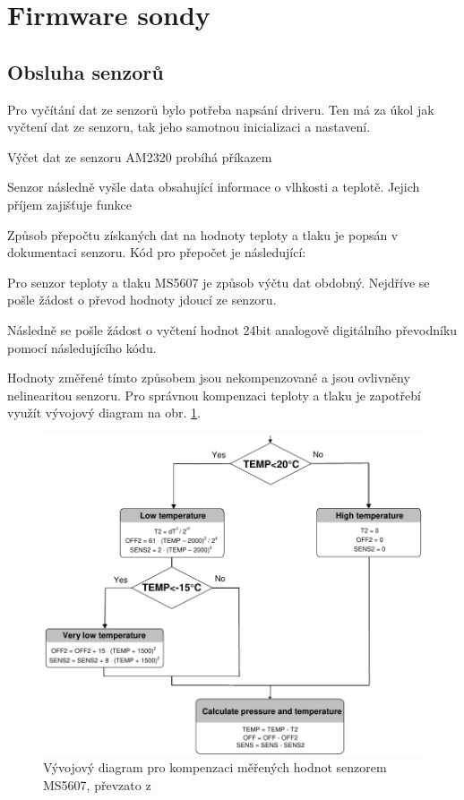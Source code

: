 \documentclass[twoside]{ctuthesis}
\theoremstyle{plain}
\theoremstyle{definition}
\theoremstyle{note}
\begin{document}
	\section{Firmware sondy}
		\subsection{Obsluha senzorů}
		Pro vyčítání dat ze senzorů bylo potřeba napsání driveru. Ten má za úkol jak vyčtení dat ze senzoru, tak jeho samotnou inicializaci a nastavení. 

		Výčet dat ze senzoru AM2320 probíhá příkazem
		

		Senzor následně vyšle data obsahující informace o vlhkosti a teplotě. Jejich příjem zajišťuje funkce
		

		Způsob přepočtu získaných dat na hodnoty teploty a tlaku je popsán v dokumentaci senzoru. Kód pro přepočet je následující:
		

		Pro senzor teploty a tlaku MS5607 je způsob výčtu dat obdobný. Nejdříve se pošle žádost o převod hodnoty jdoucí ze senzoru.
		
		Následně se pošle žádost o vyčtení hodnot 24bit analogově digitálního převodníku pomocí následujícího kódu.
		

		Hodnoty změřené tímto způsobem jsou nekompenzované a jsou ovlivněny nelinearitou senzoru. Pro správnou kompenzaci teploty a tlaku je zapotřebí využít vývojový diagram na obr. \ref{fig:ms5607:flowchart}.
		\begin{figure}
			\centering
			\includegraphics[width=.7\textwidth]{Figures/MS5607_flowchart.pdf}
			\caption{Vývojový diagram pro kompenzaci měřených hodnot senzorem MS5607, převzato z \cite{dsh_MS5607}}
			\label{fig:ms5607:flowchart}
		\end{figure}
\end{document}
